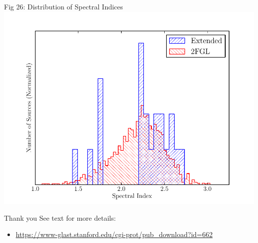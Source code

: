 \documentclass[12pt]{beamer}
\begin{document}
\begin{frame}{Fig 26: Distribution of Spectral Indices}
  \includegraphics[scale=0.60]{plots/compare_index_2FGL_color.pdf}
\end{frame}

\begin{frame}{Thank you}
  See text for more details:
  \begin{itemize}
    \item
  \url{https://www-glast.stanford.edu/cgi-prot/pub_download?id=662}
  \end{itemize}
\end{frame}
\end{document}
